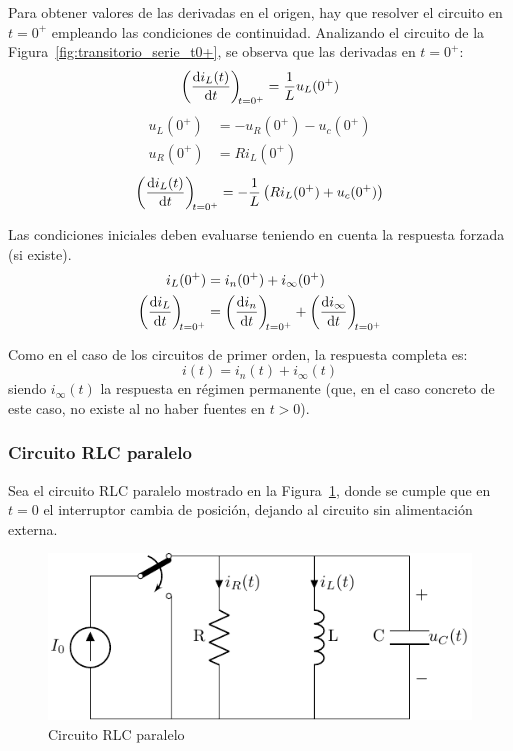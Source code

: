Para obtener valores de las derivadas en el origen, hay que resolver
el circuito en \(t = 0^+\) empleando las condiciones de
continuidad. Analizando el circuito de la
Figura~\ref{fig:transitorio_serie_t0+}, se observa que las derivadas
en $t=0^+$:
\[
  \diff{i_L(t)}{t}[t = 0^+] = \frac{1}{L} u_L(0^+)
\]
\begin{align*}
  u_L(0^+) &= -u_R(0^+) - u_c(0^+)\\
  u_R(0^+) &= R i_L(0^+)
\end{align*}
\[ {\diff{i_L(t)}{t}[t = 0^+] = - \frac{1}{L}\left(R i_L(0^+) +
      u_c(0^+)\right)}
\]
\begin{remark}
  Las condiciones iniciales deben evaluarse teniendo en cuenta la
  respuesta forzada (si existe).
  \begin{align*}
    i_L(0^+) &= i_n(0^+) + i_{\infty}(0^+)\\
    \diff{i_L}{t}[t = 0^+] &= \diff{i_n}{t}[t = 0^+] + \diff{i_{\infty}}{t}[t = 0^+]  
  \end{align*}
\end{remark}
Como en el caso de los circuitos de primer orden, la respuesta
completa es:
\begin{equation*}
  i(t)=i_n(t)+i_\infty(t)
\end{equation*}
siendo $i_\infty(t)$ la respuesta en régimen permanente (que, en el
caso concreto de este caso, no existe al no haber fuentes en $t>0$).

\subsubsection{Circuito RLC paralelo}

Sea el circuito RLC paralelo mostrado en la
Figura~\ref{fig:transitorio_circuito_RLC_paralelo}, donde se cumple
que en $t = 0$ el interruptor cambia de posición, dejando al circuito
sin alimentación externa.
\begin{figure}[H]
  \centering
  \includegraphics{../figs/transitorio_circuitoRLC_paralelo.pdf}
  \caption{Circuito RLC paralelo}
  \label{fig:transitorio_circuito_RLC_paralelo}
\end{figure}

